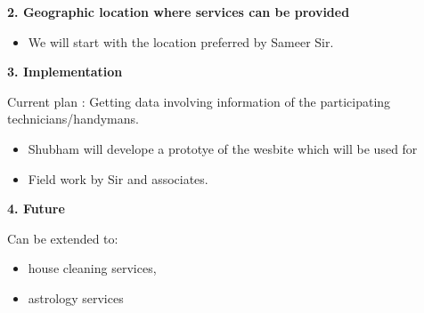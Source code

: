 \documentclass[10pt,a4paper]{article}
\begin{document}
\textbf{2. Geographic location where services can be provided}

\begin{itemize}
	\item We will start with the location preferred by Sameer Sir.
\end{itemize}

\textbf{3. Implementation}

Current plan :  Getting data involving information of the participating technicians/handymans.
\begin{itemize}
	\item Shubham will develope a prototye of the wesbite which will be used for
	\item Field work by Sir and associates.
\end{itemize}

\textbf{4. Future}

Can be extended to:
\begin{itemize}
	\item  house cleaning services, 
	\item  astrology services
\end{itemize}
\end{document}
